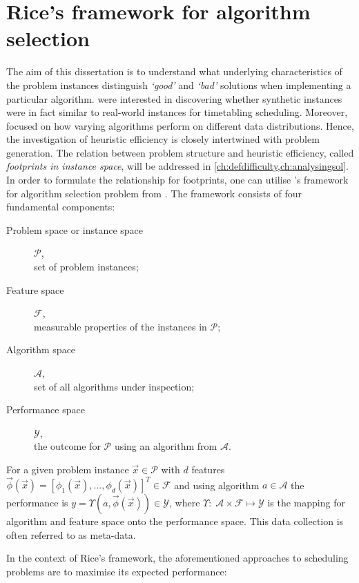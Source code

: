 \section{Rice's framework for algorithm selection}\label{sec:rice}
The aim of this dissertation is to understand what underlying characteristics 
of the problem instances distinguish \emph{`good'} and \emph{`bad'} solutions 
when implementing a particular algorithm. \citet{SmithMilesLion5} were 
interested in discovering whether synthetic instances were in fact similar to 
real-world instances for timetabling scheduling. Moreover,  
\citeauthor{SmithMilesLion5} focused on how varying algorithms perform 
on different data distributions. Hence, the investigation of heuristic 
efficiency is closely intertwined with problem generation. 
The relation between problem structure and heuristic efficiency, called 
\emph{footprints in instance space}, will be addressed in 
\cref{ch:defdifficulty,ch:analysingsol}.
In order to formulate the relationship for footprints, one can utilise 
\citeauthor{Rice76}'s framework for algorithm selection problem 
from \citeyear{Rice76}. The framework consists of four fundamental components:
\begin{description}
	\item[Problem space or instance space] $\mathcal{P}$, \hfill\\
	set of problem instances; 
	\item[Feature space] $\mathcal{F}$, \hfill\\
	measurable properties of the instances in $\mathcal{P}$;
	\item[Algorithm space] $\mathcal{A}$, \hfill\\
	set of all algorithms under inspection;
	\item[Performance space] $\mathcal{Y}$, \hfill\\
	the outcome for $\mathcal{P}$ using an algorithm from $\mathcal{A}$.
\end{description}
For a given problem instance $\vec{x}\in\mathcal{P}$ with $d$ features 
$\vec{\phi}(\vec{x})=\left[\phi_1(\vec{x}),...,\phi_d( 
\vec{x})\right]^T\in\mathcal{F}$ and using algorithm $a\in\mathcal{A}$ the 
performance is $y=\Upsilon(a,\vec{\phi}(\vec{x}))\in\mathcal{Y}$, where 
$\Upsilon:\;\mathcal{A}\times\mathcal{F} \mapsto \mathcal{Y}$ is the mapping 
for algorithm and feature space onto the performance space. This data 
collection is often referred to as meta-data. 

In the context of Rice's framework, the aforementioned approaches to scheduling problems are to maximise its expected performance: 

